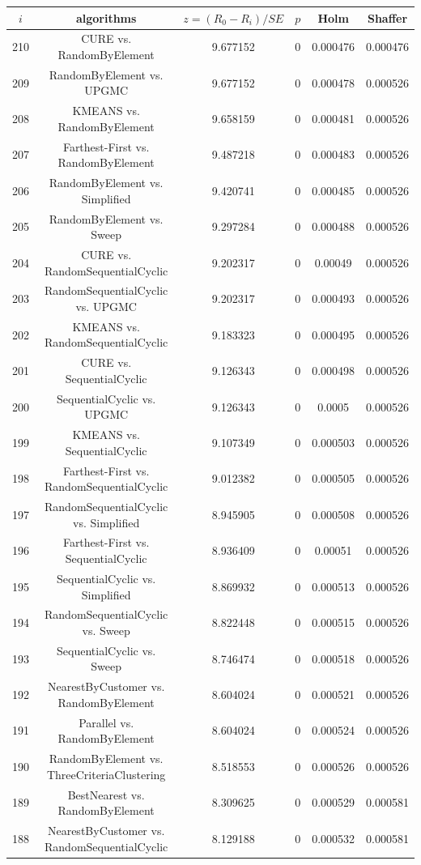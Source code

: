\documentclass[a4paper,10pt]{article}
\begin{document}
\begin{landscape}
\begin{table}[!htp]
\centering\scriptsize
\begin{tabular}{cccccc}
$i$&algorithms&$z=(R_0 - R_i)/SE$&$p$&Holm&Shaffer\\
\hline210&CURE vs. RandomByElement&9.677152&0&0.000476&0.000476\\
209&RandomByElement vs. UPGMC&9.677152&0&0.000478&0.000526\\
208&KMEANS vs. RandomByElement&9.658159&0&0.000481&0.000526\\
207&Farthest-First vs. RandomByElement&9.487218&0&0.000483&0.000526\\
206&RandomByElement vs. Simplified&9.420741&0&0.000485&0.000526\\
205&RandomByElement vs. Sweep&9.297284&0&0.000488&0.000526\\
204&CURE vs. RandomSequentialCyclic&9.202317&0&0.00049&0.000526\\
203&RandomSequentialCyclic vs. UPGMC&9.202317&0&0.000493&0.000526\\
202&KMEANS vs. RandomSequentialCyclic&9.183323&0&0.000495&0.000526\\
201&CURE vs. SequentialCyclic&9.126343&0&0.000498&0.000526\\
200&SequentialCyclic vs. UPGMC&9.126343&0&0.0005&0.000526\\
199&KMEANS vs. SequentialCyclic&9.107349&0&0.000503&0.000526\\
198&Farthest-First vs. RandomSequentialCyclic&9.012382&0&0.000505&0.000526\\
197&RandomSequentialCyclic vs. Simplified&8.945905&0&0.000508&0.000526\\
196&Farthest-First vs. SequentialCyclic&8.936409&0&0.00051&0.000526\\
195&SequentialCyclic vs. Simplified&8.869932&0&0.000513&0.000526\\
194&RandomSequentialCyclic vs. Sweep&8.822448&0&0.000515&0.000526\\
193&SequentialCyclic vs. Sweep&8.746474&0&0.000518&0.000526\\
192&NearestByCustomer vs. RandomByElement&8.604024&0&0.000521&0.000526\\
191&Parallel vs. RandomByElement&8.604024&0&0.000524&0.000526\\
190&RandomByElement vs. ThreeCriteriaClustering&8.518553&0&0.000526&0.000526\\
189&BestNearest vs. RandomByElement&8.309625&0&0.000529&0.000581\\
188&NearestByCustomer vs. RandomSequentialCyclic&8.129188&0&0.000532&0.000581\\

\end{tabular}
\end{table}
\end{landscape}
\end{document}
